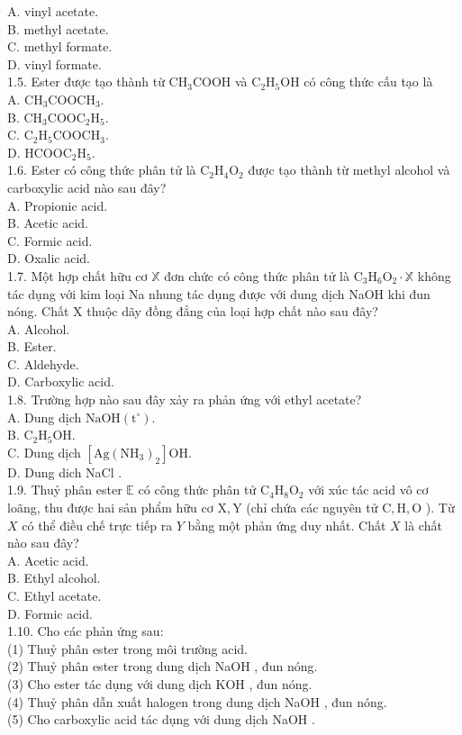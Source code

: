 \documentclass[10pt]{article}
\begin{document}
A. vinyl acetate.\\
B. methyl acetate.\\
C. methyl formate.\\
D. vinyl formate.\\
1.5. Ester được tạo thành từ $\mathrm{CH}_{3} \mathrm{COOH}$ và $\mathrm{C}_{2} \mathrm{H}_{5} \mathrm{OH}$ có công thức cấu tạo là\\
A. $\mathrm{CH}_{3} \mathrm{COOCH}_{3}$.\\
B. $\mathrm{CH}_{3} \mathrm{COOC}_{2} \mathrm{H}_{5}$.\\
C. $\mathrm{C}_{2} \mathrm{H}_{5} \mathrm{COOCH}_{3}$.\\
D. $\mathrm{HCOOC}_{2} \mathrm{H}_{5}$.\\
1.6. Ester có công thức phân tử là $\mathrm{C}_{2} \mathrm{H}_{4} \mathrm{O}_{2}$ được tạo thành từ methyl alcohol và carboxylic acid nào sau đây?\\
A. Propionic acid.\\
B. Acetic acid.\\
C. Formic acid.\\
D. Oxalic acid.\\
1.7. Một hợp chất hữu cơ $\mathbb{X}$ đơn chức có công thức phân tử là $\mathrm{C}_{3} \mathrm{H}_{6} \mathrm{O}_{2} \cdot \mathbb{X}$ không tác dụng với kim loại Na nhung tác dụng được với dung dịch NaOH khi đun nóng. Chất X thuộc dãy đồng đẳng của loại hợp chất nào sau đây?\\
A. Alcohol.\\
B. Ester.\\
C. Aldehyde.\\
D. Carboxylic acid.\\
1.8. Trường hợp nào sau đây xảy ra phản ứng với ethyl acetate?\\
A. Dung dịch $\mathrm{NaOH}\left(\mathrm{t}^{\circ}\right)$.\\
B. $\mathrm{C}_{2} \mathrm{H}_{5} \mathrm{OH}$.\\
C. Dung dịch $\left[\mathrm{Ag}\left(\mathrm{NH}_{3}\right)_{2}\right] \mathrm{OH}$.\\
D. Dung dich NaCl .\\
1.9. Thuỷ phân ester $\mathbb{E}$ có công thức phân tử $\mathrm{C}_{4} \mathrm{H}_{8} \mathrm{O}_{2}$ với xúc tác acid vô cơ loãng, thu được hai sản phẩm hữu cơ $\mathrm{X}, \mathrm{Y}$ (chỉ chứa các nguyên tử $\mathrm{C}, \mathrm{H}, \mathrm{O}$ ). Từ $X$ có thể điều chế trực tiếp ra $Y$ bằng một phản ứng duy nhất. Chất $X$ là chất nào sau đây?\\
A. Acetic acid.\\
B. Ethyl alcohol.\\
C. Ethyl acetate.\\
D. Formic acid.\\
1.10. Cho các phản ứng sau:\\
(1) Thuỷ phân ester trong môi trường acid.\\
(2) Thuỷ phân ester trong dung dịch NaOH , đun nóng.\\
(3) Cho ester tác dụng với dung dịch KOH , đun nóng.\\
(4) Thuỷ phân dẫn xuất halogen trong dung dịch NaOH , đun nóng.\\
(5) Cho carboxylic acid tác dụng với dung dịch NaOH .
\end{document}
